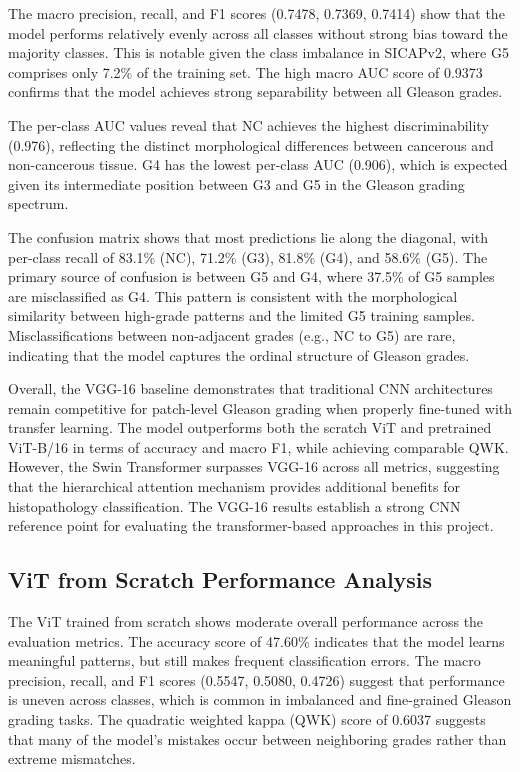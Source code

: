 \documentclass[conference]{IEEEtran}
\begin{document}
The macro precision, recall, and F1 scores (0.7478, 0.7369, 0.7414) show that the model performs relatively evenly across all classes without strong bias toward the majority classes. This is notable given the class imbalance in SICAPv2, where G5 comprises only 7.2\% of the training set. The high macro AUC score of 0.9373 confirms that the model achieves strong separability between all Gleason grades.

The per-class AUC values reveal that NC achieves the highest discriminability (0.976), reflecting the distinct morphological differences between cancerous and non-cancerous tissue. G4 has the lowest per-class AUC (0.906), which is expected given its intermediate position between G3 and G5 in the Gleason grading spectrum.

The confusion matrix shows that most predictions lie along the diagonal, with per-class recall of 83.1\% (NC), 71.2\% (G3), 81.8\% (G4), and 58.6\% (G5). The primary source of confusion is between G5 and G4, where 37.5\% of G5 samples are misclassified as G4. This pattern is consistent with the morphological similarity between high-grade patterns and the limited G5 training samples. Misclassifications between non-adjacent grades (e.g., NC to G5) are rare, indicating that the model captures the ordinal structure of Gleason grades.

Overall, the VGG-16 baseline demonstrates that traditional CNN architectures remain competitive for patch-level Gleason grading when properly fine-tuned with transfer learning. The model outperforms both the scratch ViT and pretrained ViT-B/16 in terms of accuracy and macro F1, while achieving comparable QWK. However, the Swin Transformer surpasses VGG-16 across all metrics, suggesting that the hierarchical attention mechanism provides additional benefits for histopathology classification. The VGG-16 results establish a strong CNN reference point for evaluating the transformer-based approaches in this project.

\subsection{\textbf{ViT from Scratch Performance Analysis}}
The ViT trained from scratch shows moderate overall performance across the evaluation metrics. The accuracy score of 47.60\% indicates that the model learns meaningful patterns, but still makes frequent classification errors. The macro precision, recall, and F1 scores (0.5547, 0.5080, 0.4726) suggest that performance is uneven across classes, which is common in imbalanced and fine-grained Gleason grading tasks. The quadratic weighted kappa (QWK) score of 0.6037 suggests that many of the model's mistakes occur between neighboring grades rather than extreme mismatches.
\end{document}

